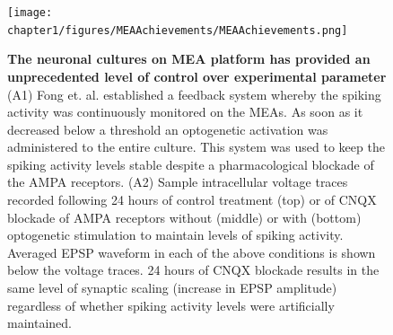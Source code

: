     \begin{figure}[!htb]
        \centering
        \texttt{[image: chapter1/figures/MEAAchievements/MEAAchievements.png]}
        \caption[Examples studies demonstrating the utility of neuronal culture based research system]{\textbf{The neuronal cultures on MEA platform has provided an unprecedented level of control over experimental parameter} (A1) Fong et. al. established a feedback system whereby the spiking activity was continuously monitored on the MEAs. As soon as it decreased below a threshold an optogenetic activation was administered to the entire culture. This system was used to keep the spiking activity levels stable despite a pharmacological blockade of the AMPA receptors. (A2) Sample intracellular voltage traces recorded following 24 hours of control treatment (top) or of CNQX blockade of AMPA receptors without (middle) or with (bottom) optogenetic stimulation to maintain levels of spiking activity. Averaged EPSP waveform in each of the above conditions is shown below the voltage traces. 24 hours of CNQX blockade results in the same level of synaptic scaling (increase in EPSP amplitude) regardless of whether spiking activity levels were artificially maintained.}


    \end{figure}
    \clearpage


